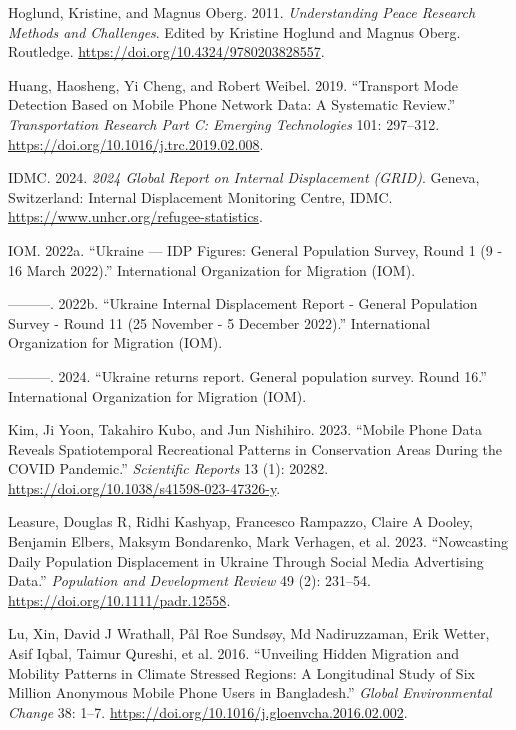 \documentclass[
  sn-nature,
  11pt,
]{sn-jnl}
\newlength{\cslhangindent}
\newenvironment{CSLReferences}[2] %
 {\begin{list}{}{%
  \setlength{\itemindent}{0pt}
  \setlength{\leftmargin}{0pt}
  \setlength{\parsep}{0pt}
  \ifodd #1
   \setlength{\leftmargin}{\cslhangindent}
   \setlength{\itemindent}{-1\cslhangindent}
  \fi
  \setlength{\itemsep}{#2\baselineskip}}}
 {\end{list}}
\begin{document}
\begin{CSLReferences}{1}{0}
Hoglund, Kristine, and Magnus Oberg. 2011. \emph{Understanding Peace
Research Methods and Challenges}. Edited by Kristine Hoglund and Magnus
Oberg. Routledge. \url{https://doi.org/10.4324/9780203828557}.

Huang, Haosheng, Yi Cheng, and Robert Weibel. 2019. {``Transport Mode
Detection Based on Mobile Phone Network Data: {A} Systematic Review.''}
\emph{Transportation Research Part C: Emerging Technologies} 101:
297--312. \url{https://doi.org/10.1016/j.trc.2019.02.008}.

IDMC. 2024. \emph{2024 Global Report on Internal Displacement {(GRID)}}.
Geneva, Switzerland: {Internal Displacement Monitoring Centre, IDMC}.
\url{https://www.unhcr.org/refugee-statistics}.

IOM. 2022a. {``Ukraine --- IDP Figures: General Population Survey, Round
1 (9 - 16 March 2022).''} International Organization for Migration
(IOM).

---------. 2022b. {``Ukraine Internal Displacement Report - General
Population Survey - Round 11 (25 November - 5 December 2022).''}
International Organization for Migration (IOM).

---------. 2024. {``{Ukraine returns report. General population survey.
Round 16}.''} {International Organization for Migration (IOM)}.

Kim, Ji Yoon, Takahiro Kubo, and Jun Nishihiro. 2023. {``Mobile Phone
Data Reveals Spatiotemporal Recreational Patterns in Conservation Areas
During the {COVID} Pandemic.''} \emph{Scientific Reports} 13 (1): 20282.
\url{https://doi.org/10.1038/s41598-023-47326-y}.

Leasure, Douglas R, Ridhi Kashyap, Francesco Rampazzo, Claire A Dooley,
Benjamin Elbers, Maksym Bondarenko, Mark Verhagen, et al. 2023.
{``Nowcasting Daily Population Displacement in {Ukraine} Through Social
Media Advertising Data.''} \emph{Population and Development Review} 49
(2): 231--54. \url{https://doi.org/10.1111/padr.12558}.

Lu, Xin, David J Wrathall, Pål Roe Sundsøy, Md Nadiruzzaman, Erik
Wetter, Asif Iqbal, Taimur Qureshi, et al. 2016. {``Unveiling Hidden
Migration and Mobility Patterns in Climate Stressed Regions: {A}
Longitudinal Study of Six Million Anonymous Mobile Phone Users in
{Bangladesh}.''} \emph{Global Environmental Change} 38: 1--7.
\url{https://doi.org/10.1016/j.gloenvcha.2016.02.002}.


\end{CSLReferences}
\end{document}
